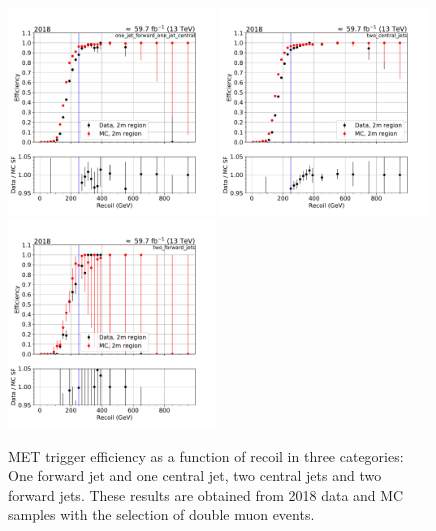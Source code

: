 
\begin{figure}[htp]
    \begin{center}
        \includegraphics[width=0.49\textwidth]{fig/efficiency/trigger/met/recoil/data_mc_comparison_2m_2018_one_jet_forward_one_jet_central.pdf}
        \includegraphics[width=0.49\textwidth]{fig/efficiency/trigger/met/recoil/data_mc_comparison_2m_2018_two_central_jets.pdf} \\
        \includegraphics[width=0.49\textwidth]{fig/efficiency/trigger/met/recoil/data_mc_comparison_2m_2018_two_forward_jets.pdf}
    \end{center}
    \caption{MET trigger efficiency as a function of recoil in three categories: One forward jet and one central jet, two central jets and
            two forward jets. These results are obtained from 2018 data and MC samples with the selection of double muon events.} 
    \label{fig:eff_recoil_2018_2m}      
\end{figure}

